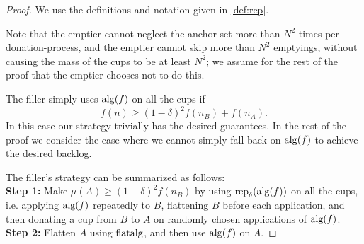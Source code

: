 \begin{proof}
  We use the definitions and notation given in \cref{def:rep}. 

  Note that the emptier cannot neglect the anchor set more than
  $N^2$ times per donation-process, and the emptier cannot skip
  more than $N^2$ emptyings, without causing the mass of the cups
  to be at least $N^2$; we assume for the rest of the proof that
  the emptier chooses not to do this.

  The filler simply uses $\operatorname{\text{\textup{alg}}}(f)$ on all the cups if 
  $$f(n) \ge (1-\delta)^2 f(n_B) + f(n_A).$$
  In this case our strategy trivially has the desired guarantees. 
  In the rest of the proof we consider the case where we cannot
  simply fall back on $\operatorname{\text{\textup{alg}}}(f)$ to achieve the desired backlog.

  The filler's strategy can be summarized as follows:\\
  \textbf{Step 1:} Make $\mu(A) \ge (1-\delta)^2 f(n_B)$ by
  using $\operatorname{\text{\textup{rep}}}_\delta(\operatorname{\text{\textup{alg}}}(f))$ on all the cups,
  i.e. applying $\operatorname{\text{\textup{alg}}}(f)$ repeatedly to $B$, flattening $B$ before
  each application, and then donating a cup from $B$ to $A$ on
  randomly chosen applications of $\operatorname{\text{\textup{alg}}}(f)$.\\
  \textbf{Step 2:} Flatten $A$ using $\operatorname{\text{\textup{flatalg}}}$, and then use
  $\operatorname{\text{\textup{alg}}}(f)$ on $A$.


\end{proof}
